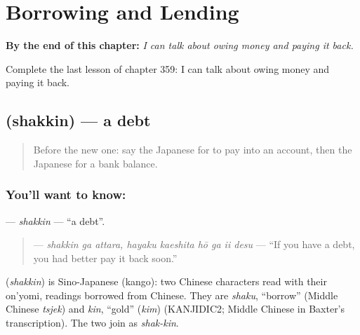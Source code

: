 
\chapter{Borrowing and Lending}
\label{ch:ja-borrowing-and-lending}

\begin{chapteropening}
\textbf{By the end of this chapter:} \emph{I can talk about owing money and paying it back.}

Complete the last lesson of chapter 359: I can talk about owing money and paying it back.
\end{chapteropening}

\section[\texorpdfstring{\ja{しゃっきん} (shakkin)}{しゃっきん (shakkin)}]{ (shakkin) — a debt}

\label{lesson:JA-C359-shakkin}



\begin{quote}
Before the new one: say the Japanese for to pay into an account, then the Japanese for a bank balance.
\end{quote}

\subsection*{You'll want to know: }
\textbf{} — \emph{shakkin} — \textquotedblleft{}a debt\textquotedblright{}.

\begin{quote}
\textbf{    } — \emph{shakkin ga attara, hayaku kaeshita hō ga ii desu} — \textquotedblleft{}If you have a debt, you had better pay it back soon.\textquotedblright{}
\end{quote}

\begin{cousinweb}
\textbf{} (\emph{shakkin}) is Sino-Japanese (kango): two Chinese characters read with their on'yomi, readings borrowed from Chinese. They are \emph{shaku}, \textquotedblleft{}borrow\textquotedblright{} (Middle Chinese \emph{tsjek}) and \emph{kin}, \textquotedblleft{}gold\textquotedblright{} (\emph{kim}) (KANJIDIC2; Middle Chinese in Baxter's transcription). The two join as \emph{shak-kin}.
\end{cousinweb}

